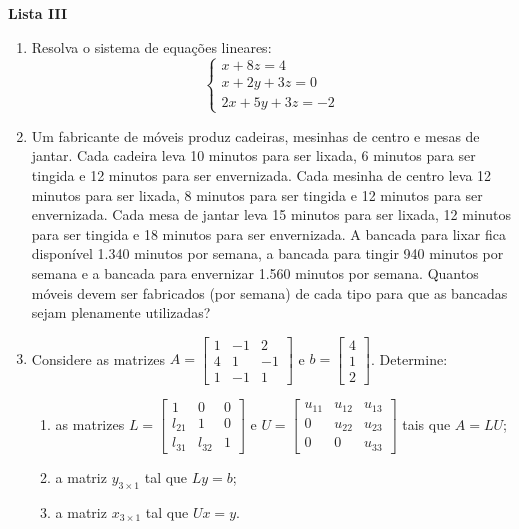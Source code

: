 \documentclass[12pt,a4paper]{article}
\begin{document}
\begin{center}
  \textbf{Lista III}
\end{center}

\begin{enumerate}
  \item Resolva o sistema de equações lineares:
    $$\begin{cases}
      x +  8 z  =  4\\
      x  +  2y  +  3z  =  0\\
      2x  +  5y  +  3z  =  -2
    \end{cases}$$

  \item Um fabricante de móveis produz cadeiras, mesinhas de centro e mesas
    de jantar. Cada cadeira leva 10 minutos para ser lixada, 6 minutos
    para ser tingida e 12 minutos para ser envernizada. Cada mesinha de
    centro leva 12 minutos para ser lixada, 8 minutos para ser tingida
    e 12 minutos para ser envernizada. Cada mesa de jantar leva 15 minutos
    para ser lixada, 12 minutos para ser tingida e 18 minutos para ser
    envernizada. A bancada para lixar fica disponível 1.340 minutos por
    semana, a bancada para tingir 940 minutos por semana e a bancada para
    envernizar 1.560 minutos por semana. Quantos móveis devem ser fabricados
    (por semana) de cada tipo para que as bancadas sejam plenamente utilizadas?

  \item Considere as matrizes 
    $A = \begin{bmatrix} 1 & -1 & 2 \\ 4 & 1 & -1 \\ 1 & -1 & 1\end{bmatrix}$ e 
    $b = \begin{bmatrix} 4 \\ 1 \\ 2\end{bmatrix}$. Determine:
    
    \begin{enumerate}
      \item as matrizes $L = \begin{bmatrix} 1 & 0 & 0 \\ l_{21} & 1 & 0 \\ l_{31} & l_{32} & 1\end{bmatrix}$ 
        e $U = \begin{bmatrix} u_{11} & u_{12} & u_{13} \\ 0 & u_{22} & u_{23} \\ 0 & 0 & u_{33}\end{bmatrix}$ 
        tais que $A = LU$;
      \item a matriz $y_{3\times 1}$ tal que $Ly = b$;
      \item a matriz $x_{3\times 1}$ tal que $Ux = y$.
    \end{enumerate}
    

\end{enumerate}
\end{document}
